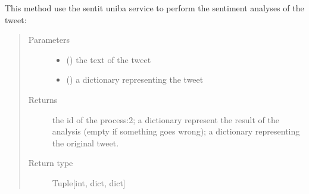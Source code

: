 \documentclass[letterpaper,10pt,english]{sphinxmanual}
\begin{document}
\begin{fulllineitems}
\begin{fulllineitems}
\label{\detokenize{code_comment/tweet_processor:hate_tweet_map.tweets_processor.TweetProcessor.ProcessTweet.__sent_it_analyze_sentiment}}
\sphinxAtStartPar
This method use the sent\sphinxhyphen{}it uniba service to perform the sentiment analyses of the tweet:
\begin{quote}\begin{description}
\item[{Parameters}] \leavevmode\begin{itemize}
\item {} 
\sphinxAtStartPar
{} () \textendash{} the text of the tweet

\item {} 
\sphinxAtStartPar
{} () \textendash{} a dictionary representing the tweet

\end{itemize}

\item[{Returns}] \leavevmode
\sphinxAtStartPar
the id of the process:2; a dictionary represent the result of the analysis (empty if something goes wrong); a dictionary representing the original tweet.

\item[{Return type}] \leavevmode
\sphinxAtStartPar
Tuple{[}int, dict, dict{]}

\end{description}\end{quote}

\end{fulllineitems}



\end{fulllineitems}
\end{document}

